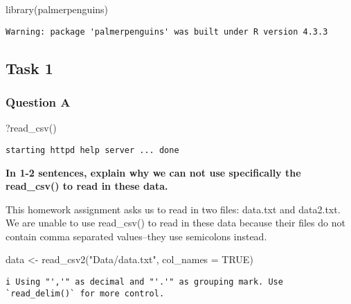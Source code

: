\documentclass[
  letterpaper,
  DIV=11,
  numbers=noendperiod]{scrartcl}
\newenvironment{Shaded}{\begin{snugshade}}{\end{snugshade}}
\newcommand{\AttributeTok}[1]{\textcolor[rgb]{0.40,0.45,0.13}{#1}}
\newcommand{\ConstantTok}[1]{\textcolor[rgb]{0.56,0.35,0.01}{#1}}
\newcommand{\FunctionTok}[1]{\textcolor[rgb]{0.28,0.35,0.67}{#1}}
\newcommand{\NormalTok}[1]{\textcolor[rgb]{0.00,0.23,0.31}{#1}}
\newcommand{\OtherTok}[1]{\textcolor[rgb]{0.00,0.23,0.31}{#1}}
\newcommand{\StringTok}[1]{\textcolor[rgb]{0.13,0.47,0.30}{#1}}
\begin{document}
\begin{Shaded}
\begin{Highlighting}[]
\FunctionTok{library}\NormalTok{(palmerpenguins)}
\end{Highlighting}
\end{Shaded}

\begin{verbatim}
Warning: package 'palmerpenguins' was built under R version 4.3.3
\end{verbatim}

\subsection{Task 1}\label{task-1}

\subsubsection{Question A}\label{question-a}

\begin{Shaded}
\begin{Highlighting}[]
\NormalTok{?}\FunctionTok{read\_csv}\NormalTok{()}
\end{Highlighting}
\end{Shaded}

\begin{verbatim}
starting httpd help server ... done
\end{verbatim}

\textbf{In 1-2 sentences, explain why we can not use specifically the
read\_csv() to read in these data.}

This homework assignment asks us to read in two files: data.txt and
data2.txt. We are unable to use read\_csv() to read in these data
because their files do not contain comma separated values--they use
semicolons instead.

\begin{Shaded}
\begin{Highlighting}[]
\NormalTok{data }\OtherTok{\textless{}{-}} \FunctionTok{read\_csv2}\NormalTok{(}\StringTok{"Data/data.txt"}\NormalTok{, }
                  \AttributeTok{col\_names =} \ConstantTok{TRUE}\NormalTok{)}
\end{Highlighting}
\end{Shaded}

\begin{verbatim}
i Using "','" as decimal and "'.'" as grouping mark. Use `read_delim()` for more control.
\end{verbatim}
\end{document}
